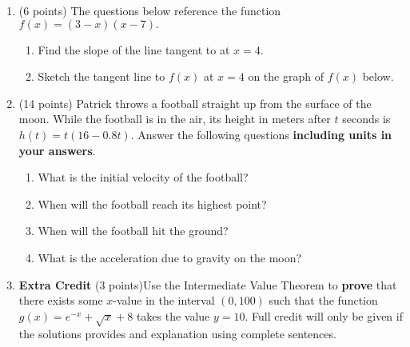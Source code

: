 \documentclass[12pt]{article}
\begin{document}
\begin{enumerate}
\newpage
\item (6 points) The questions below reference the function $f(x)=(3-x)(x-7).$ 
	\begin{enumerate}
	\item Find the slope of the line tangent to at $x=4$. 
	\vfill
	
	\item Sketch the tangent line to $f(x)$ at $x=4$ on the graph of $f(x)$ below.

\begin{center}
 \end{center}
\end{enumerate}
\item (14 points) Patrick throws a football straight up from the surface of the moon. While the football is in the air, its height in meters after $t$ seconds is $h(t)=t(16-0.8t)$. Answer the following questions {\bf including units in your answers}.

	\begin{enumerate}

	\item What is the initial velocity of the football?\\ \vfill

	\item When will the football reach its highest point?\\ \vfill


	\item When will the football hit the ground?\\ \vfill

	\item What is the acceleration due to gravity on the moon?\\ \vfill

\end{enumerate}
\newpage
\item \textbf{Extra Credit} (3 points)Use the Intermediate Value Theorem to \textbf{prove} that there exists some
$x$-value in the interval $(0,100)$ such that the function $g(x)=e^{-x}+\sqrt{x}+8$ takes the value $y=10.$ Full credit will only be given if the solutions provides and explanation using complete sentences.

\end{enumerate}
\end{document}
